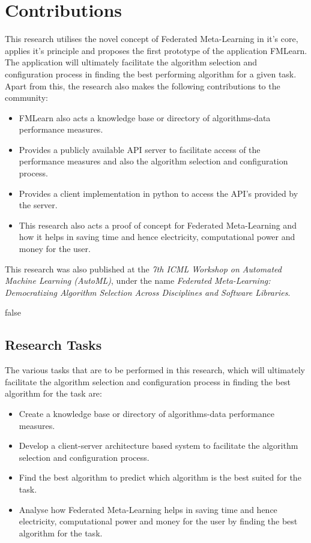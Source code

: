 \section{Contributions}
This research utilises the novel concept of Federated Meta-Learning in it's core, applies it's principle and proposes the first prototype of the application FMLearn. The application will ultimately facilitate the algorithm selection and configuration process in finding the best performing algorithm for a given task. Apart from this, the research also makes the following contributions to the community:

\begin{itemize}
    \item FMLearn also acts a knowledge base or directory of algorithms-data performance measures.
    \item Provides a publicly available API server to facilitate access of the performance measures and also the algorithm selection and configuration process.
    \item Provides a client implementation in python to access the API's provided by the server.
    \item This research also acts a proof of concept for Federated Meta-Learning and how it helps in saving time and hence electricity, computational power and money for the user.
\end{itemize}

This research was also published at the \textit{7th ICML Workshop on Automated Machine Learning (AutoML)}, under the name \textit{Federated Meta-Learning: Democratizing Algorithm Selection Across Disciplines and Software Libraries}.

\if false

\subsection{Research Tasks}
The various tasks that are to be performed in this research, which will ultimately facilitate the algorithm selection and configuration process in finding the best algorithm for the task are:

\begin{itemize}
    \item Create a knowledge base or directory of algorithms-data performance measures.
    \item Develop a client-server architecture based system to facilitate the algorithm selection and configuration process.
    \item Find the best algorithm to predict which algorithm is the best suited for the task.
    \item Analyse how Federated Meta-Learning helps in saving time and hence electricity, computational power and money for the user by finding the best algorithm for the task.
\end{itemize}

